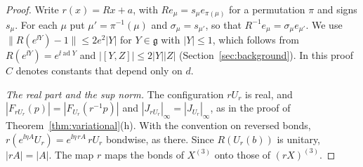 \begin{proof}
Write $r(x)=Rx+a$, with $Re_\mu=s_\mu e_{\pi(\mu)}$ for a permutation $\pi$ and signs $s_\mu$. For each $\mu$ put $\mu'=\pi^{-1}(\mu)$ and $\sigma_\mu=s_{\mu'}$, so that $R^{-1}e_\mu=\sigma_\mu e_{\mu'}$. We use $\|R(e^{\ii Y})-1\|\le2e^2|Y|$ for $Y\in\mathfrak g$ with $|Y|\le1$, which follows from $R(e^{\ii Y})=e^{\ii\operatorname{ad}Y}$ and $|[Y,Z]|\le2|Y||Z|$ (Section~\ref{sec:background}). In this proof $C$ denotes constants that depend only on $d$.

\emph{The real part and the sup norm.} The configuration $rU_r$ is real, and $|F_{rU_r}(p)|=|F_{U_r}(r^{-1}p)|$ and $|J_{rU_r}|_\infty=|J_{U_r}|_\infty$, as in the proof of Theorem~\ref{thm:variational}(h). With the convention on reversed bonds, $r(e^{\ii\eta A}U_r)=e^{\ii\eta\,rA}\,rU_r$ bondwise, as there. Since $R(U_r(b))$ is unitary, $|rA|=|A|$. The map $r$ maps the bonds of $X^{(3)}$ onto those of $(rX)^{(3)}$.


\end{proof}
